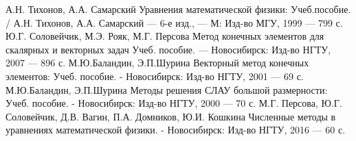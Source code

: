 \documentclass[14pt,a4paper]{extreport}
\begin{document}
%
%


%

\newpage

\tableofcontents
\newpage

\setcounter{page}{3}

%


%
%

\newpage

\renewcommand\bibname{СПИСОК ИСПОЛЬЗУЕМЫХ ИСТОЧНИКОВ}

\begin{thebibliography}{00}
    		А.Н. Тихонов, А.А. Самарский Уравнения математической физики: Учеб.пособие. / А.Н. Тихонов, А.А. Самарский — 6-е изд., — М: Изд-во МГУ, 1999 — 799 с.
			Ю.Г. Соловейчик, М.Э. Рояк, М.Г. Персова Метод конечных элементов для скалярных и векторных задач Учеб. пособие. — Новосибирск: Изд-во НГТУ, 2007 — 896 с.
			М.Ю.Баландин, Э.П.Шурина Векторный метод конечных элементов: Учеб. пособие. - Новосибирск: Изд-во НГТУ, 2001 — 69 с.
  			М.Ю.Баландин, Э.П.Шурина Методы решения СЛАУ большой размерности: Учеб. пособие. - Новосибирск: Изд-во НГТУ, 2000 — 70 с.
    		М.Г. Персова, Ю.Г. Соловейчик, Д.В. Вагин, П.А. Домников, Ю.И. Кошкина Численные методы в уравнениях математической физики.  - Новосибирск: Изд-во НГТУ, 2016 — 60 с.
\end{thebibliography}

\newpage
%
%

\end{document}
